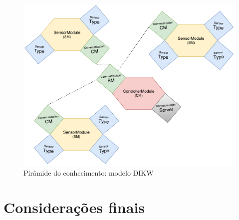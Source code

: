 \begin{figure}[!htb]
	\centering
	\includegraphics[scale=0.45]{esquemas/general-electronic-modules.pdf}
	\caption{Pirâmide do conhecimento: modelo DIKW}
	\label{dikw}
\end{figure}






\section{Considerações finais}